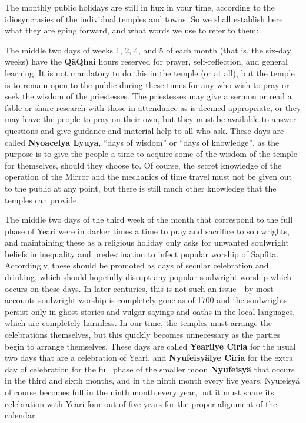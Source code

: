 \documentclass{article}
\begin{document}
The monthly public holidays are still in flux in your time, according to the idiosyncrasies of the individual temples and towns.  So we shall establish here what they are going forward, and what words we use to refer to them:

The middle two days of weeks 1, 2, 4, and 5 of each month (that is, the six-day weeks) have the \textbf{Q\"aQhai} hours reserved for prayer, self-reflection, and general learning.  It is not mandatory to do this in the temple (or at all), but the temple is to remain open to the public during these times for any who wish to pray or seek the wisdom of the priestesses.  The priestesses may give a sermon or read a fable or share research with those in attendance as is deemed appropriate, or they may leave the people to pray on their own, but they must be available to answer questions and give guidance and material help to all who ask.  These days are called \textbf{Nyoacelya Lyuya}, ``days of wisdom'' or ``days of knowledge'', as the purpose is to give the people a time to acquire some of the wisdom of the temple for themselves, should they choose to.  Of course, the secret knowledge of the operation of the Mirror and the mechanics of time travel must not be given out to the public at any point, but there is still much other knowledge that the temples can provide.

The middle two days of the third week of the month that correspond to the full phase of Yeari were in darker times a time to pray and sacrifice to soulwrights, and maintaining these as a religious holiday only asks for unwanted soulwright beliefs in inequality and predestination to infect popular worship of Sapfita.  Accordingly, these should be promoted as days of secular celebration and drinking, which should hopefully disrupt any popular soulwright worship which occurs on these days.  In later centuries, this is not such an issue - by most accounts soulwright worship is completely gone as of 1700 and the soulwrights persist only in ghost stories and vulgar sayings and oaths in the local languages, which are completely harmless.  In our time, the temples must arrange the celebrations themselves, but this quickly becomes unnecessary as the parties begin to arrange themselves. These days are called \textbf{Yearilye Ciria} for the usual two days that are a celebration of Yeari, and \textbf{Nyufeisy\"alye Ciria} for the extra day of celebration for the full phase of the smaller moon \textbf{Nyufeisy\"a} that occurs in the third and sixth months, and in the ninth month every five years.  Nyufeisy\"a of course becomes full in the ninth month every year, but it must share its celebration with Yeari four out of five years for the proper alignment of the calendar.
\end{document}
